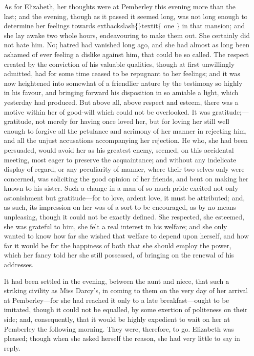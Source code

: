 \documentclass[10pt]{book}
\begin{document}
   As for Elizabeth, her thoughts were at Pemberley this evening more than
the last; and the evening, though as it passed it seemed long, was not
long enough to determine her feelings towards
   	extbackslash\{\}textit\{
    one
   \}
   in that mansion; and
she lay awake two whole hours, endeavouring to make them out. She
certainly did not hate him. No; hatred had vanished long ago, and she
had almost as long been ashamed of ever feeling a dislike against him,
that could be so called. The respect created by the conviction of his
valuable qualities, though at first unwillingly admitted, had for some
time ceased to be repugnant to her feelings; and it was now heightened
into somewhat of a friendlier nature by the testimony so highly in his
favour, and bringing forward his disposition in so amiable a light,
which yesterday had produced. But above all, above respect and esteem,
there was a motive within her of good-will which could not be
overlooked. It was gratitude;—gratitude, not merely for having once
loved her, but for loving her still well enough to forgive all the
petulance and acrimony of her manner in rejecting him, and all the
unjust accusations accompanying her rejection. He who, she had been
persuaded, would avoid her as his greatest enemy, seemed, on this
accidental
   meeting, most eager to preserve the acquaintance; and
without any indelicate display of regard, or any peculiarity of manner,
where their two selves only were concerned, was soliciting the good
opinion of her friends, and bent on making her known to his sister. Such
a change in a man of so much pride excited not only astonishment but
gratitude—for to love, ardent love, it must be attributed; and, as
such, its impression on her was of a sort to be encouraged, as by no
means unpleasing, though it could not be exactly defined. She respected,
she esteemed, she was grateful to him, she felt a real interest in his
welfare; and she only wanted to know how far she wished that welfare to
depend upon herself, and how far it would be for the happiness of both
that she should employ the power, which her fancy told her she still
possessed, of bringing on the renewal of his addresses.
  

   It had been settled in the evening, between the aunt and niece, that
such a striking civility as Miss Darcy’s, in coming to them on the very
day of her arrival at Pemberley—for she had reached it only to a late
breakfast—ought to be imitated, though it could not be equalled, by
some exertion of politeness on their side; and, consequently, that it
would be highly expedient to wait on her at Pemberley the following
morning. They were, therefore, to go. Elizabeth was pleased; though when
she asked herself the reason, she had very little to say in reply.
  
\end{document}
